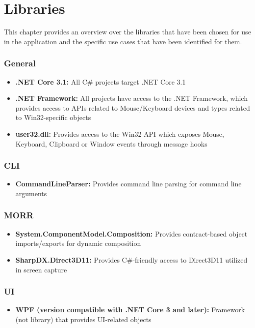 \chapter{Libraries}
\label{ch:libraries}

\newcommand{\lib}[2]{\item{\textbf{#1: }{#2}}}

This chapter provides an overview over the libraries that have been chosen for use in the application and the specific use cases that have been identified for them.

\subsection*{General}

\begin{itemize}
    \lib{.NET Core 3.1}{All C\# projects target .NET Core 3.1}
    \lib{.NET Framework}{All projects have access to the .NET Framework, which provides access to APIs related to Mouse/Keyboard devices and types related to Win32-specific objects}
    \lib{user32.dll}{Provides access to the Win32-API which exposes Mouse, Keyboard, Clipboard or Window events through message hooks}
\end{itemize}

\subsection*{CLI}

\begin{itemize}
    \lib{CommandLineParser}{Provides command line parsing for command line arguments}
\end{itemize}

\subsection*{MORR}

\begin{itemize}
    \lib{System.ComponentModel.Composition}{Provides contract-based object imports/exports for dynamic composition}
    \lib{SharpDX.Direct3D11}{Provides C\#-friendly access to Direct3D11 utilized in screen capture}
\end{itemize}

\subsection*{UI}

\begin{itemize}
    \lib{WPF (version compatible with .NET Core 3 and later)}{Framework (not library) that provides UI-related objects}
\end{itemize}